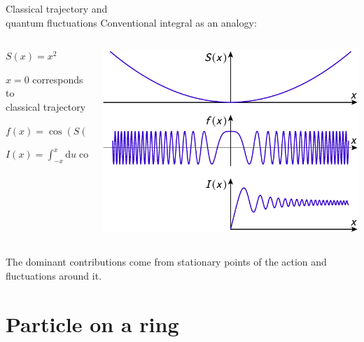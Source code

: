 \documentclass[t,dvipsnames]{beamer}
\begin{document}
\begin{frame}[t]{Classical trajectory and\\ quantum fluctuations}
 \vspace{0.4truecm}
 Conventional integral as an analogy:

 \vspace{0.5truecm}
 \begin{columns}
  \begin{column}[b]{0.37\textwidth}
   $S(x)=x^2$
	  
   $x=0$ corresponds to\\[-0.1truecm] classical trajectory

   \vspace{0.8truecm}
   $f(x)=\cos(S(x))$

   \vspace{0.9truecm}
   $I(x)=\int_{-x}^x\text{d}u\cos(S(u))$

   \vspace{0.3truecm}
  \end{column}\hspace{-0.5truecm}%
  \begin{column}[b]{0.6\textwidth}
   \includegraphics[width=\textwidth]{saddlepoint}
  \end{column}%
 \end{columns}

 The dominant contributions come from stationary points of the action and
 fluctuations around it.
\end{frame}

\section{Particle on a ring}
\end{document}
